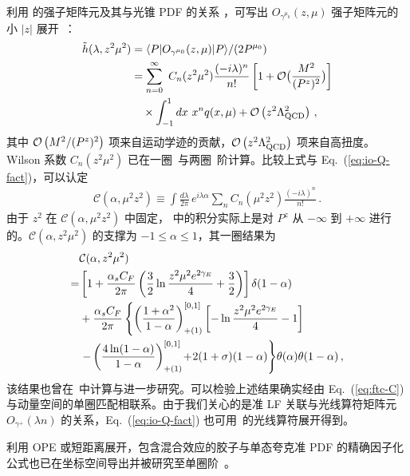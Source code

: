 利用  的强子矩阵元及其与光锥 PDF 的关系 ，可写出 $O_{\gamma^{\mu_0}}(z,\mu) $ 强子矩阵元的小 $|z|$ 展开~\cite{Izubuchi:2018srq}：
\begin{align}\label{eq:ope}
	\tilde{h}(\lambda,z^2\mu^2)&=\langle P| O_{\gamma^{\mu_0}}(z,\mu) |P\rangle/(2P^{\mu_0}) \nonumber\\
	&= \sum_{n=0}^\infty\ C_n(z^2\mu^2){(-i\lambda)^n\over n!}\left[1+{\cal O}\big({M^2\over (P^z)^2}\big)\right]\nonumber\\
	&\quad\times \int_{-1}^1 dx\ x^n q(x,\mu) + {\cal O}\left(z^2\Lambda_{\text{QCD}}^2\right)\,,
\end{align}
其中 ${\cal O}\left(M^2/(P^z)^2\right)$ 项来自运动学迹的贡献，${\cal O}\left(z^2\Lambda_{\text{QCD}}^2\right)$ 项来自高扭度。Wilson 系数 $C_n(z^2\mu^2)$ 已在一圈~\cite{Izubuchi:2018srq}与两圈~\cite{Li:2020xml}阶计算。比较上式与 Eq.~(\ref{eq:io-Q-fact})，可以认定
\begin{align}  \label{eq:fac-C}
	\mathcal{C} (\alpha, {\mu}^2 z^2) \equiv \int\! \frac{d \lambda}{2 \pi} \,
	e^{i  \lambda \alpha}  \sum_n C_n ({\mu}^2 z^2)  \frac{(-i \lambda)^n}{n!}
	\,.
\end{align}
由于 $z^2$ 在 $\mathcal{C} (\alpha, {\mu}^2 z^2)$ 中固定， 中的积分实际上是对 $P^z$ 从 $-\infty$ 到 $+\infty$ 进行的。$\mathcal{C}(\alpha,z^2\mu^2)$ 的支撑为 $-1 \le \alpha \le 1$，其一圈结果为
\begin{align} \label{eq:ps-c}
	&{\cal C}(\alpha,z^2\mu^2)\\
	=& \left[ 1+ {\alpha_sC_F\over 2\pi}\left({3\over2}\ln{z^2\mu^2e^{2\gamma_E}\over 4}+{3\over2}\right)\right]\delta(1-\alpha)\nonumber
	\\
	&+ {\alpha_sC_F\over 2\pi}\left\{\left({1+\alpha^2\over 1-\alpha}\right)^{[0,1]}_{+(1)}\left[-\ln{z^2\mu^2e^{2\gamma_E}\over 4}-1\right]\right.\nonumber\\
	&\left. - \left(4\ln(1-\alpha)\over 1-\alpha\right)^{[0,1]}_{+(1)}\!  +\!2(1+\sigma)(1-\alpha)\right\}\!\theta(\alpha)\theta(1-\alpha)
	\,,\nonumber
\end{align}
该结果也曾在~\cite{Ji:2017rah,Radyushkin:2017lvu,Radyushkin:2018cvn,Zhang:2018ggy,Li:2020xml}中计算与进一步研究。可以检验上述结果确实经由 Eq.~(\ref{eq:ftc-C}) 与动量空间的单圈匹配相联系。由于我们关心的是准 LF 关联与光线算符矩阵元 $O_{\gamma^+}(\lambda n)$ 的关系，Eq.~(\ref{eq:io-Q-fact}) 也可用~\cite{Balitsky:1987bk,Braun:1994jq,Braun:2007wv}的光线算符展开得到。

利用 OPE 或短距离展开，包含混合效应的胶子与单态夸克准 PDF 的精确因子化公式也已在坐标空间导出并被研究至单圈阶~\cite{Wang:2019tgg,Balitsky:2019krf}。

